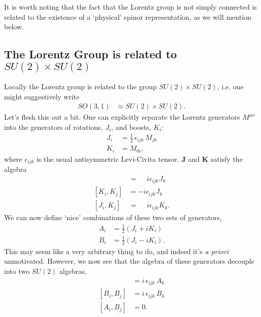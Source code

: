 \documentclass[12pt]{article}
\numberwithin{equation}{section}    %
\begin{document}
It is worth noting that the fact that the Lorentz group is not simply connected is related to the existence of a `physical' spinor representation, as we will mention below.

\subsection{\texorpdfstring{The Lorentz Group is related to $SU(2) \times SU(2)$}{The Lorentz Group is related to SU(2)xSU(2)}}


Locally the Lorentz group is related to the group $SU(2)\times SU(2)$, i.e. one might suggestively write
\begin{align}
	SO(3,1) &\approx SU(2)\times SU(2).
\end{align}
Let's flesh this out a bit. One can explicitly separate the Lorentz generators $M^{\mu\nu}$ into the generators of rotations, $J_i$, and boosts, $K_i$:
\begin{align}
	J_i &= \frac 12 \,\epsilon_{ijk}\,M_{jk}\label{eq:Poincare:J}\\
	K_i &= M_{0i},\label{eq:Poincare:K}
\end{align}
where $\epsilon_{ijk}$ is the usual antisymmetric Levi-Civita tensor. 
$\mathbf J$ and $\mathbf K$ satisfy the algebra
\begin{align}
	[J_i, J_j] &= \phantom+ i\epsilon_{ijk}J_k\label{eq:SUSYalg:JJ}\\
	[K_i, K_j] &= -i\epsilon_{ijk}J_k\label{eq:SUSYalg:KK}\\
	[J_i, K_j] &= \phantom+ i\epsilon_{ijk}K_k.\label{eq:SUSYalg:JK}
\end{align}
We can now define `nice' combinations of these two sets of generators,
\begin{align}
	A_i &= \frac 12 (J_i + iK_i)\label{eq:SUSYalg:Ai}\\
	B_i &= \frac 12 (J_i - iK_i)\label{eq:SUSYalg:Bi}.
\end{align}
This may seem like a very arbitrary thing to do, and indeed it's \textit{a priori} unmotivated. However, we now see that the algebra of these generators decouple into two $SU(2)$ algebras,
\begin{align}
	[A_i,A_j] &= i\,\epsilon_{ijk}\, A_k\\
	[B_i,B_j] &= i\,\epsilon_{ijk}\, B_k\\
	[A_i,B_j] &= 0.
\end{align}
\end{document}

